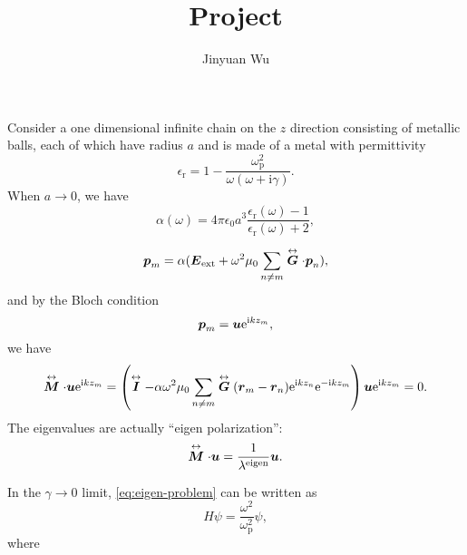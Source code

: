 \documentclass[hyperref, a4paper]{article}
\title{Project}
\author{Jinyuan Wu}
\newcommand*{\ii}{\mathrm{i}}
\newcommand*{\ee}{\mathrm{e}}
\renewcommand{\tensor}[1]{ \stackrel{\leftrightarrow}{\vb*{#1}}}
\begin{document}
\maketitle

Consider a one dimensional infinite chain on the $z$ direction consisting of metallic balls, 
each of which have radius $a$ and is made of a metal with permittivity
\begin{equation}
    \epsilon_\text{r} = 1 - \frac{\omega_\text{p}^2}{\omega (\omega + \ii \gamma)}.
\end{equation} 
When $a \to 0$, we have
\begin{equation}
    \alpha(\omega) = 4 \pi \epsilon_0 a^3 \frac{\epsilon_\text{r}(\omega) - 1}{\epsilon_\text{r}(\omega) + 2},
\end{equation}

\begin{equation}
    \vb*{p}_m = \alpha (\vb*{E}_\text{ext} + \omega^2 \mu_0 \sum_{n \neq m} \tensor{\vb*{G}} \cdot \vb*{p}_n),
\end{equation}
and by the Bloch condition 
\begin{equation}
    \vb*{p}_m = \vb*{u} \ee^{\ii k z_m},
\end{equation}
we have 
\begin{equation}
    \tensor{\vb*{M}} \cdot \vb*{u} \ee^{\ii k z_m} = \left( \tensor{\vb*{I}} - \alpha \omega^2 \mu_0 \sum_{n \neq m} \tensor{\vb*{G}}(\vb*{r}_m - \vb*{r}_n) \ee^{\ii k z_n} \ee^{- \ii k z_m}  \right) \vb*{u} \ee^{\ii k z_m} = 0.
    \label{eq:eigen-problem}
\end{equation}
The eigenvalues are actually ``eigen polarization'':
\begin{equation}
    \tensor{\vb*{M}} \cdot \vb*{u} = \frac{1}{\lambda^\text{eigen}} \vb*{u}.
\end{equation}

In the $\gamma \to 0$ limit, \eqref{eq:eigen-problem} can be written as 
\begin{equation}
    H \psi = \frac{\omega^2}{\omega_\text{p}^2} \psi,
\end{equation}
where 
\end{document}

